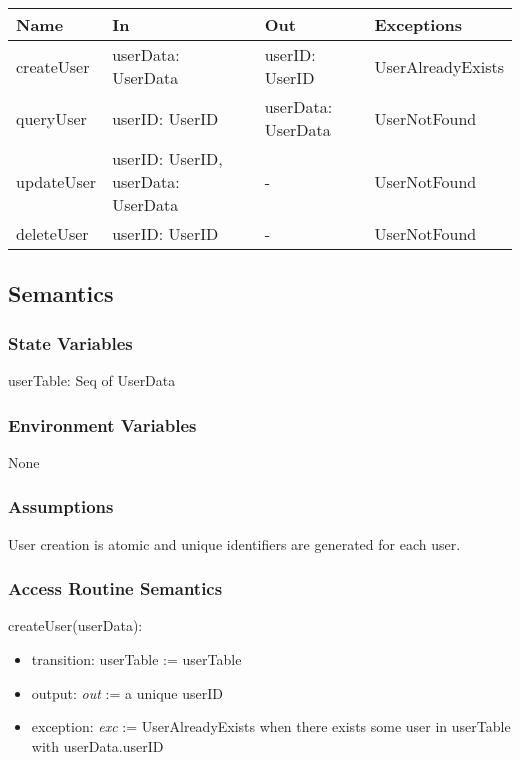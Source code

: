 \documentclass[12pt, titlepage]{article}
\begin{document}
\begin{center}
\begin{tabular}{p{2cm} p{4cm} p{4cm} p{2cm}}
\hline
\textbf{Name} & \textbf{In} & \textbf{Out} & \textbf{Exceptions} \\
\hline
createUser & userData: UserData & userID: UserID & UserAlreadyExists \\
queryUser & userID: UserID & userData: UserData & UserNotFound \\
updateUser & userID: UserID, userData: UserData & - & UserNotFound \\
deleteUser & userID: UserID & - & UserNotFound \\
\hline
\end{tabular}
\end{center}

\subsection{Semantics}

\subsubsection{State Variables}

userTable: Seq of UserData

\subsubsection{Environment Variables}

None

\subsubsection{Assumptions}

User creation is atomic and unique identifiers are generated for each user.

\subsubsection{Access Routine Semantics}

\noindent createUser(userData):
\begin{itemize}
\item transition: userTable := userTable 
\item output: \textit{out} := a unique userID
\item exception: \textit{exc} := UserAlreadyExists when there exists some user in userTable with userData.userID
\end{itemize}
\end{document}
